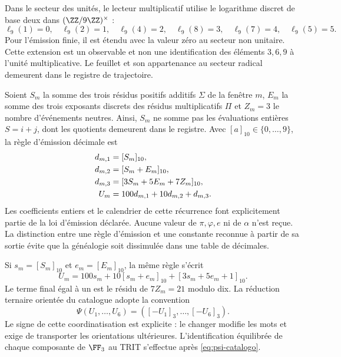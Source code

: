 Dans le secteur des unités, le lecteur multiplicatif utilise le logarithme discret de base deux dans \((\ZZ/9\ZZ)^\times\) :
\[
 \ell_9(1)=0,\quad\ell_9(2)=1,\quad\ell_9(4)=2,\quad
 \ell_9(8)=3,\quad\ell_9(7)=4,\quad\ell_9(5)=5.
\]
Pour l’émission finie, il est étendu avec la valeur zéro au secteur non unitaire. Cette extension est un observable et non une identification des éléments \(3,6,9\) à l’unité multiplicative. Le feuillet et son appartenance au secteur radical demeurent dans le registre de trajectoire.

Soient \(S_m\) la somme des trois résidus positifs additifs \(\Sigma\) de la fenêtre \(m\), \(E_m\) la somme des trois exposants discrets des résidus multiplicatifs \(\Pi\) et \(Z_m=3\) le nombre d’événements neutres. Ainsi, \(S_m\) ne somme pas les évaluations entières \(S=i+j\), dont les quotients demeurent dans le registre. Avec \([a]_{10}\in\{0,\ldots,9\}\), la règle d’émission décimale est
\begin{align}
 d_{m,1}&=[S_m]_{10},\notag\\
 d_{m,2}&=[S_m+E_m]_{10},\notag\\
 d_{m,3}&=[3S_m+5E_m+7Z_m]_{10},\notag\\
 U_m&=100d_{m,1}+10d_{m,2}+d_{m,3}.
 \label{eq:emisor-seis}
\end{align}
Les coefficients entiers et le calendrier de cette récurrence font explicitement partie de la loi d’émission déclarée. Aucune valeur de \(\pi,\varphi,e\) ni de \(\alpha\) n’est reçue. La distinction entre une règle d’émission et une constante reconnue à partir de sa sortie évite que la généalogie soit dissimulée dans une table de décimales.

Si \(s_m=[S_m]_{10}\) et \(e_m=[E_m]_{10}\), la même règle s’écrit
\begin{equation}
 U_m=100s_m+10[s_m+e_m]_{10}+[3s_m+5e_m+1]_{10}.
 \label{eq:acoplamiento}
\end{equation}
Le terme final égal à un est le résidu de \(7Z_m=21\) modulo dix. La réduction ternaire orientée du catalogue adopte la convention
\begin{equation}
 \Psi(U_1,\ldots,U_6)=([-U_1]_3,\ldots,[-U_6]_3).
 \label{eq:psi-catalogo}
\end{equation}
Le signe de cette coordinatisation est explicite : le changer modifie les mots et exige de transporter les orientations ultérieures. L'identification équilibrée de chaque composante de \(\FF_3\) au TRIT s'effectue après \eqref{eq:psi-catalogo}.

